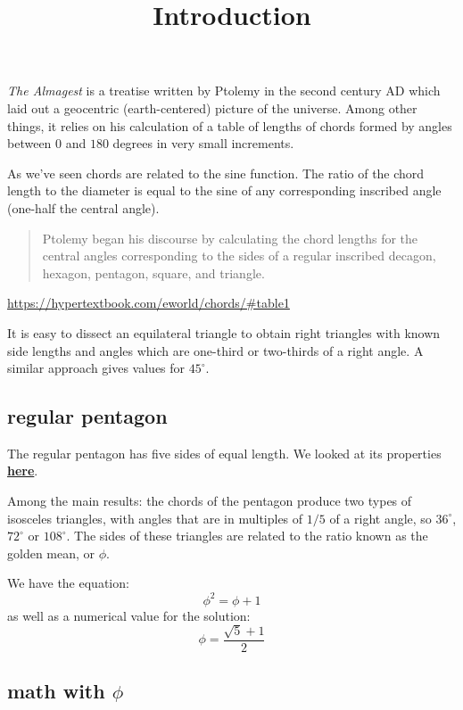 \documentclass[11pt, oneside]{article}
\title{Introduction}
\date{}
\begin{document}
\maketitle
\Large

\label{sec:Almagest}

\emph{The Almagest} is a treatise written by Ptolemy in the second century AD which laid out a geocentric (earth-centered) picture of the universe.  Among other things, it relies on his calculation of a table of lengths of chords formed by angles between $0$ and $180$ degrees in very small increments.

As we've seen chords are related to the sine function.  The ratio of the chord length to the diameter is equal to the sine of any corresponding inscribed angle (one-half the central angle).

\begin{quote}
Ptolemy began his discourse by calculating the chord lengths for the central
angles corresponding to the sides of a regular inscribed decagon, hexagon,
pentagon, square, and triangle.
\end{quote}

\url{https://hypertextbook.com/eworld/chords/#table1}

It is easy to dissect an equilateral triangle to obtain right triangles with known side lengths and angles which are one-third or two-thirds of a right angle.  A similar approach gives values for $45^{\circ}$.

\subsection*{regular pentagon}

The regular pentagon has five sides of equal length.  We looked at its properties \hyperref[sec:pentagons]{\textbf{here}}.

Among the main results:  the chords of the pentagon produce two types of isosceles triangles, with angles that are in multiples of $1/5$ of a right angle, so $36^{\circ}$, $72^{\circ}$ or $108^{\circ}$.  The sides of these triangles are related to the ratio known as the golden mean, or $\phi$.

We have the equation:
\[ \phi^2 = \phi + 1 \]
as well as a numerical value for the solution:
\[ \phi = \frac{\sqrt{5} + 1}{2} \]

\subsection*{math with $\phi$}
\end{document}
